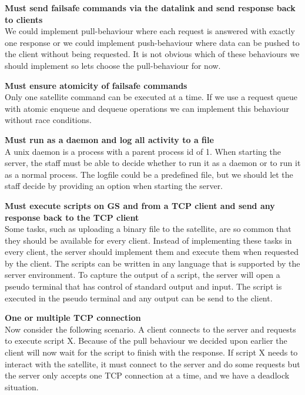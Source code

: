 \textbf{Must send failsafe commands via the datalink and send response back to clients} \\
We could implement pull-behaviour where each request is answered with exactly one response or we could implement push-behaviour where data can be pushed to the client without being requested. It is not obvious which of these behaviours we should implement so lets choose the pull-behaviour for now.

\textbf{Must ensure atomicity of failsafe commands} \\
Only one satellite command can be executed at a time. If we use a request queue with atomic enqueue and dequeue operations we can implement this behaviour without race conditions.

\textbf{Must run as a daemon and log all activity to a file} \\
A unix daemon is a process with a parent process id of 1. When starting the server, the staff must be able to decide whether to run it as a daemon or to run it as a normal process.
The logfile could be a predefined file, but we should let the staff decide by providing an option when starting the server.

\textbf{Must execute scripts on GS and from a TCP client and send any response back to the TCP client} \\
Some tasks, such as uploading a binary file to the satellite, are so common that they should be available for every client. Instead of implementing these tasks in every client, the server should implement them and execute them when requested by the client.
The scripts can be written in any language that is supported by the server environment. To capture the output of a script, the server will open a pseudo terminal that has control of standard output and input. The script is executed in the pseudo terminal and any output can be send to the client.

\textbf{One or multiple TCP connection} \\
Now consider the following scenario. A client connects to the server and requests to execute script X. Because of the pull behaviour we decided upon earlier the client will now wait for the script to finish with the response. If script X needs to interact with the satellite, it must connect to the server and do some requests but the server only accepts one TCP connection at a time, and we have a deadlock situation.

